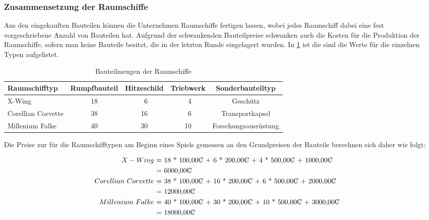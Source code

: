 \subsubsection{Zusammensetzung der Raumschiffe}
\label{subsub:spielwelt-datenbasis-raumschiffe-zusammensetzung}

Aus den eingekauften Bauteilen können die Unternehmen Raumschiffe fertigen lassen, wobei jedes Raumschiff dabei eine fest vorgeschriebene Anzahl von Bauteilen hat. Aufgrund der schwankenden Bauteilpreise schwanken auch die Kosten für die Produktion der Raumschiffe, sofern man keine Bauteile besitzt, die in der letzten Runde eingelagert wurden. In \ref{tab:spielwelt-datenbasis-raumschiffe-zusammensetzung} ist die sind die Werte für die einzelnen Typen aufgelistet.

\begin{table}[ht]\small
     \centering
     \begin{tabular}{ | l | c | c | c | c |  }
          \hline
          Raumschifftyp & Rumpfbauteil & Hitzeschild & Triebwerk & Sonderbauteiltyp \\
          \hline \hline
          X-Wing & 18 & \ 6 & \ 4 & Geschütz\\ \hline
          Corellian Corvette & 38 & 16 & \ 6 & Transportkapsel \\ \hline
          Millenium Falke & 40 & 30 & 10 & Forschungsausrüstung \\
          \hline
     \end{tabular}
     \caption{Bauteilmengen der Raumschiffe}
     \label{tab:spielwelt-datenbasis-raumschiffe-zusammensetzung}
\end{table}

Die Preise zur für die Raumschifftypen am Beginn eines Spiels gemessen an den Grundpreisen der Bauteile berechnen sich daher wie folgt:

\begin{align*}
          X-Wing\ &\text{= 18 * 100,00\curr{} +  6 * 200,00\curr{} +  4 * 500,00\curr{} + 1000,00\curr{}} \\
          \ & \text{=  6000,00\curr{}} \\
          Corellian\ Corvette\ &\text{= 38 * 100,00\curr{} + 16 * 200,00\curr{} +  6 * 500,00\curr{} + 2000,00\curr{}} \\
          \ & \text{= 12000,00\curr{}} \\
          Millenium\ Falke\ &\text{= 40 * 100,00\curr{} + 30 * 200,00\curr{} + 10 * 500,00\curr{} + 3000,00\curr{}} \\
          \ & \text{= 18000,00\curr{}} \\
\end{align*}

